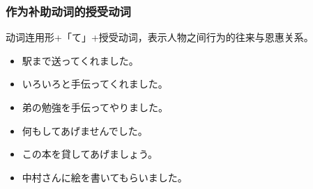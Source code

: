 \subsubsection{作为补助动词的授受动词}%

动词连用形+「て」+授受动词，表示人物之间行为的往来与恩惠关系。
\begin{itemize}
  \item 駅まで送ってくれました。
  \item いろいろと手伝ってくれました。
  \item 弟の勉強を手伝ってやりました。
  \item 何もしてあげませんでした。
  \item この本を貸してあげましょう。
  \item 中村さんに絵を書いてもらいました。
\end{itemize}




